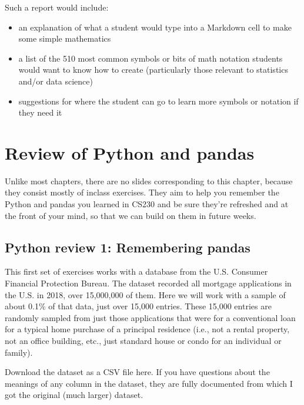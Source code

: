 \documentclass[letterpaper,10pt,english]{jupyterBook}
\begin{document}
\sphinxAtStartPar
Such a report would include:
\begin{itemize}
\item {} 
\sphinxAtStartPar
an explanation of what a student would type into a Markdown cell to make some simple mathematics

\item {} 
\sphinxAtStartPar
a list of the 5\sphinxhyphen{}10 most common symbols or bits of math notation students would want to know how to create (particularly those relevant to statistics and/or data science)

\item {} 
\sphinxAtStartPar
suggestions for where the student can go to learn more symbols or notation if they need it

\end{itemize}


\chapter{Review of Python and pandas}
\label{\detokenize{chapter-4-review-of-python-and-pandas:review-of-python-and-pandas}}\label{\detokenize{chapter-4-review-of-python-and-pandas::doc}}
\sphinxAtStartPar
Unlike most chapters, there are no slides corresponding to this chapter, because they consist mostly of in\sphinxhyphen{}class exercises.  They aim to help you remember the Python and pandas you learned in CS230 and be sure they’re refreshed and at the front of your mind, so that we can build on them in future weeks.


\section{Python review 1: Remembering pandas}
\label{\detokenize{chapter-4-review-of-python-and-pandas:python-review-1-remembering-pandas}}
\sphinxAtStartPar
This first set of exercises works with a database from the U.S. Consumer Financial Protection Bureau.  The dataset recorded all mortgage applications in the U.S. in 2018, over 15,000,000 of them.  Here we will work with a sample of about 0.1\% of that data, just over 15,000 entries.  These 15,000 entries are randomly sampled from just those applications that were for a conventional loan for a typical home purchase of a principal residence (i.e., not a rental property, not an office building, etc., just standard house or condo for an individual or family).

\sphinxAtStartPar
Download the dataset as a CSV file here.  If you have questions about the meanings of any column in the dataset, they are fully documented  from which I got the original (much larger) dataset.
\end{document}
